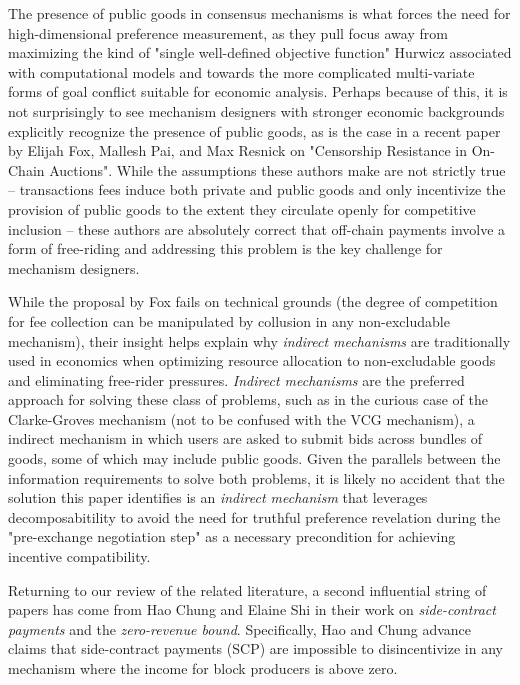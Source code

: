 \documentclass[sigconf,anonymous]{aamas}
\begin{document}
The presence of public goods in consensus mechanisms is what forces the need for high-dimensional preference measurement, as they pull focus away from maximizing the kind of "single well-defined objective function" Hurwicz associated with computational models and towards the more complicated multi-variate forms of goal conflict suitable for economic analysis. Perhaps because of this, it is not surprisingly to see mechanism designers with stronger economic backgrounds explicitly recognize the presence of public goods, as is the case in a recent paper by Elijah Fox, Mallesh Pai, and Max Resnick on "Censorship Resistance in On-Chain Auctions". While the assumptions these authors make are not strictly true -- transactions fees induce both private and public goods and only incentivize the provision of public goods to the extent they circulate openly for competitive inclusion -- these authors are absolutely correct that off-chain payments involve a form of free-riding and addressing this problem is the key challenge for mechanism designers.

While the proposal by Fox fails on technical grounds (the degree of competition for fee collection can be manipulated by collusion in any non-excludable mechanism), their insight helps explain why \textit{indirect mechanisms} are traditionally used in economics when optimizing resource allocation to non-excludable goods and eliminating free-rider pressures. \textit{Indirect mechanisms} are the preferred approach for solving these class of problems, such as in the curious case of the Clarke-Groves mechanism (not to be confused with the VCG mechanism), a indirect mechanism in which users are asked to submit bids across bundles of goods, some of which may include public goods. Given the parallels between the information requirements to solve both problems, it is likely no accident that the solution this paper identifies is an \textit{indirect mechanism} that leverages decomposabitility to avoid the need for truthful preference revelation during the "pre-exchange negotiation step" as a necessary precondition for achieving incentive compatibility.

Returning to our review of the related literature, a second influential string of papers has come from Hao Chung and Elaine Shi in their work on \textit{side-contract payments} and the \textit{zero-revenue bound}. Specifically, Hao and Chung advance claims that side-contract payments (SCP) are impossible to disincentivize in any mechanism where the income for block producers is above zero.
\end{document}
